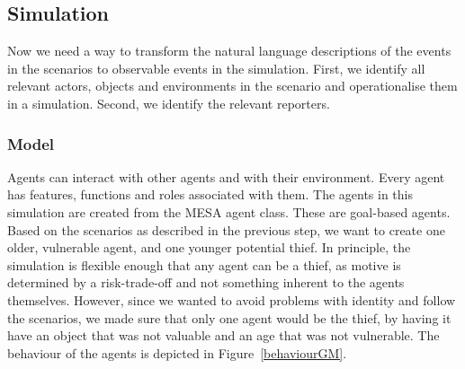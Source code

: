 \documentclass[12pt]{article}
\begin{document}


\subsection{Simulation}		%

Now we need a way to transform the natural language descriptions of the events in the scenarios to observable events in the simulation. First, we identify all relevant actors, objects and environments in the scenario and operationalise them in a simulation. Second, we identify the relevant reporters. 



\subsubsection{Model} 


Agents can interact with other agents and with their environment. Every agent has features, functions and roles associated with them. The agents in this simulation are created from the MESA agent class. These are goal-based agents.
Based on the scenarios as described in the previous step, we want to create one older, vulnerable agent, and one younger potential thief. In principle, the simulation is flexible enough that any agent can be a thief, as motive is determined by a risk-trade-off and not something inherent to the agents themselves. However, since we wanted to avoid problems with identity and follow the scenarios, we made sure that only one agent would be the thief, by having it have an object that was not valuable and an age that was not vulnerable. The behaviour of the agents is depicted in Figure~\ref{behaviourGM}.
\end{document}
